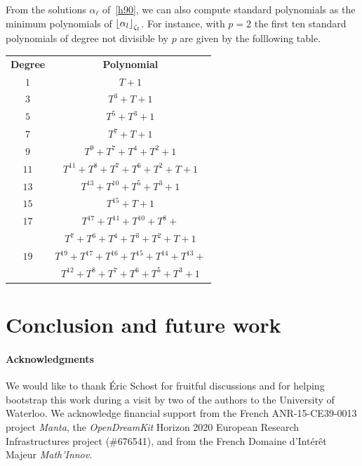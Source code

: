 \documentclass{sig-alternate}
\begin{document}
From the solutions $\alpha_\ell$ of~\ref{h90}, we can also compute standard polynomials as the
minimum polynomials of $\left\lfloor \alpha_l \right\rfloor_{\zeta_l}$. For instance, with
$p=2$ the first ten standard polynomials of degree not divisible by $p$ are
given by the folllowing table.

\begin{center}
\small{
\begin{tabular}[h]{cc}
  \bf{Degree} & \bf{Polynomial} \\
  $1$ & $T+1$ \\
  $3$ & $T^3+T+1$ \\
  $5$ & $T^5+T^3+1$ \\
  $7$ & $T^7+T+1$ \\
  $9$ & $T^9+T^7+T^4+T^2+1$ \\
  $11$ & $T^{11}+T^8+T^7+T^6+T^2+T+1$\\
  $13$ & $T^{13}+T^{10}+T^5+T^3+1$\\
  $15$ & $T^{15}+T+1$ \\
  $17$ & $T^{17}+T^{11}+T^{10}+T^8+$\\
  & $T^7+T^6+T^4+T^3+T^2+T+1$ \\
  $19$ & $T^{19}+T^{17}+T^{16}+T^{15}+T^{14}+T^{13}+$\\
  & $T^{12}+T^8+T^7+T^6+T^5+T^3+1$
\end{tabular}
}
\end{center}


\section{Conclusion and future work}
\label{sec:conclusion}

\paragraph{Acknowledgments}
We would like to thank \'Eric Schost for fruitful discussions and for
helping bootstrap this work during a visit by two of the authors to
the University of Waterloo. %
We acknowledge financial support from the French ANR-15-CE39-0013
project \emph{Manta}, the \emph{OpenDreamKit} Horizon 2020 European
Research Infrastructures project (\#676541), and from the French
Domaine d'Int\'er\^et Majeur \emph{Math'Innov}.



\end{document}
